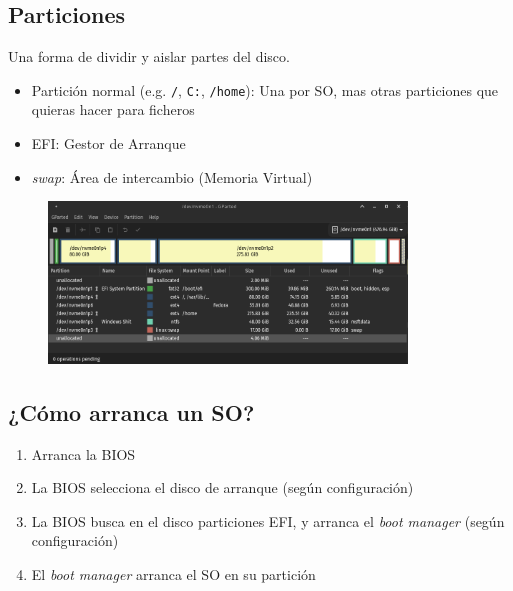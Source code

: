 \documentclass[aspectratio=43]{beamer}
\begin{document}
    \subsection{Particiones}
     \begin{frame}{\subsecname}{}
        Una forma de dividir y aislar partes del disco.
        \begin{itemize}
            \item Partición normal (e.g. \texttt{/}, \texttt{C:}, \texttt{/home}): Una por SO, mas otras particiones que quieras hacer para ficheros
            \item EFI: Gestor de Arranque
            \item \textit{swap}: Área de intercambio (Memoria Virtual)
        \end{itemize}
        \begin{figure}
            \centering
            \includegraphics[width=0.85\textwidth]{img/partitions.png}
        \end{figure}
    \end{frame}


    \subsection{¿Cómo arranca un SO?}
     \begin{frame}{\subsecname}{}
        \begin{enumerate}
            \item Arranca la BIOS
            \item La BIOS selecciona el disco de arranque (según configuración)
            \item La BIOS busca en el disco particiones EFI, y arranca el \textit{boot manager} (según configuración)
            \item El \textit{boot manager} arranca el SO en su partición
        \end{enumerate}
    \end{frame}
\end{document}
